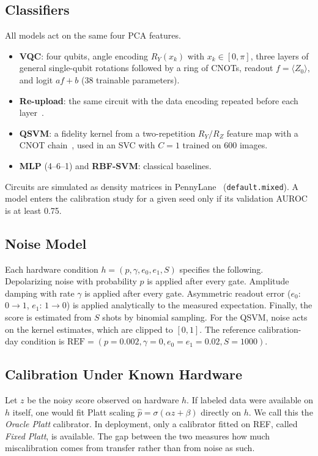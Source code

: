 \documentclass[conference]{IEEEtran}
\begin{document}
\subsection{Classifiers}

All models act on the same four PCA features.
\begin{itemize}
\item \textbf{VQC}: four qubits, angle encoding $R_Y(x_k)$ with $x_k\in[0,\pi]$, three layers of general single-qubit rotations followed by a ring of CNOTs, readout $f=\langle Z_0\rangle$, and logit $a f + b$ (38 trainable parameters).
\item \textbf{Re-upload}: the same circuit with the data encoding repeated before each layer~\cite{perez2020}.
\item \textbf{QSVM}: a fidelity kernel from a two-repetition $R_Y/R_Z$ feature map with a CNOT chain~\cite{havlicek2019}, used in an SVC with $C=1$ trained on 600 images.
\item \textbf{MLP} (4--6--1) and \textbf{RBF-SVM}: classical baselines.
\end{itemize}
Circuits are simulated as density matrices in PennyLane~\cite{bergholm2018} (\texttt{default.mixed}). A model enters the calibration study for a given seed only if its validation AUROC is at least 0.75.

\subsection{Noise Model}

Each hardware condition $h=(p,\gamma,e_0,e_1,S)$ specifies the following. Depolarizing noise with probability $p$ is applied after every gate. Amplitude damping with rate $\gamma$ is applied after every gate. Asymmetric readout error ($e_0$: $0\!\to\!1$, $e_1$: $1\!\to\!0$) is applied analytically to the measured expectation. Finally, the score is estimated from $S$ shots by binomial sampling. For the QSVM, noise acts on the kernel estimates, which are clipped to $[0,1]$. The reference calibration-day condition is $\mathrm{REF}=(p{=}0.002,\gamma{=}0,e_0{=}e_1{=}0.02,S{=}1000)$.

\subsection{Calibration Under Known Hardware}

Let $z$ be the noisy score observed on hardware $h$. If labeled data were available on $h$ itself, one would fit Platt scaling $\hat p=\sigma(\alpha z+\beta)$ directly on $h$. We call this the \emph{Oracle Platt} calibrator. In deployment, only a calibrator fitted on REF, called \emph{Fixed Platt}, is available. The gap between the two measures how much miscalibration comes from transfer rather than from noise as such.
\end{document}
